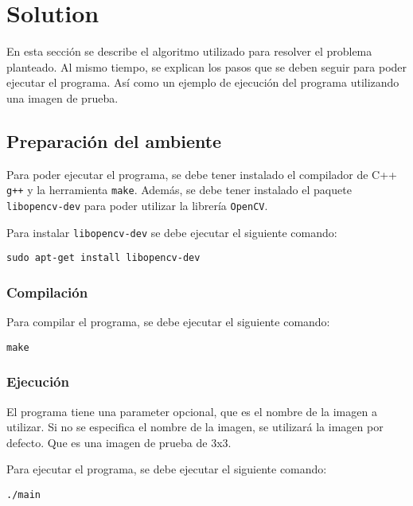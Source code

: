 \section{Solution}\label{sec:solution}

En esta sección se describe el algoritmo utilizado para resolver el problema planteado.
Al mismo tiempo, se explican los pasos que se deben seguir para poder ejecutar el programa.
Así como un ejemplo de ejecución del programa utilizando una imagen de prueba.

\subsection{Preparación del ambiente}\label{subsec:environment-preparation}

Para poder ejecutar el programa, se debe tener instalado el compilador de C++ \texttt{g++} y la herramienta \texttt{make}.
Además, se debe tener instalado el paquete \texttt{libopencv-dev} para poder utilizar la librería \texttt{OpenCV}.

Para instalar \texttt{libopencv-dev} se debe ejecutar el siguiente comando:
\begin{lstlisting}[label={lst:install-opencv}]
sudo apt-get install libopencv-dev
\end{lstlisting}

\subsubsection{Compilación}\label{subsubsec:compilation}

Para compilar el programa, se debe ejecutar el siguiente comando:
\begin{lstlisting}[label={lst:compile}]
make
\end{lstlisting}

\subsubsection{Ejecución}\label{subsubsec:execution}

El programa tiene una parameter opcional, que es el nombre de la imagen a utilizar.
Si no se especifica el nombre de la imagen, se utilizará la imagen por defecto.
Que es una imagen de prueba de 3x3.

Para ejecutar el programa, se debe ejecutar el siguiente comando:
\begin{lstlisting}[label={lst:run}]
./main
\end{lstlisting}


